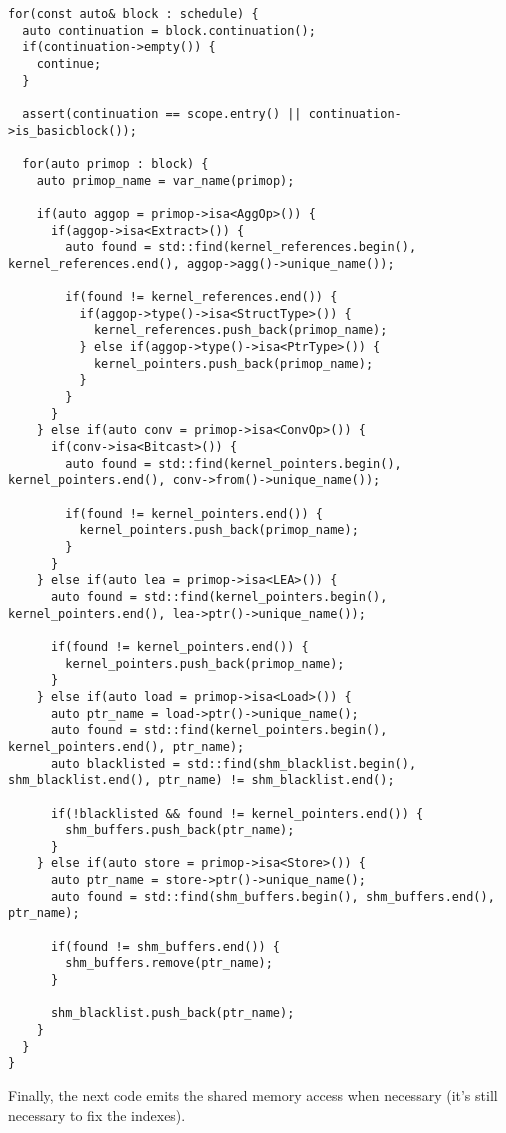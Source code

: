 \documentclass{article}
\begin{document}
\begin{verbatim}
for(const auto& block : schedule) {
  auto continuation = block.continuation();
  if(continuation->empty()) {
    continue;
  }

  assert(continuation == scope.entry() || continuation->is_basicblock());

  for(auto primop : block) {
    auto primop_name = var_name(primop);

    if(auto aggop = primop->isa<AggOp>()) {
      if(aggop->isa<Extract>()) {
        auto found = std::find(kernel_references.begin(), kernel_references.end(), aggop->agg()->unique_name());

        if(found != kernel_references.end()) {
          if(aggop->type()->isa<StructType>()) {
            kernel_references.push_back(primop_name);
          } else if(aggop->type()->isa<PtrType>()) {
            kernel_pointers.push_back(primop_name);
          }
        }
      }
    } else if(auto conv = primop->isa<ConvOp>()) {
      if(conv->isa<Bitcast>()) {
        auto found = std::find(kernel_pointers.begin(), kernel_pointers.end(), conv->from()->unique_name());

        if(found != kernel_pointers.end()) {
          kernel_pointers.push_back(primop_name);
        }
      }
    } else if(auto lea = primop->isa<LEA>()) {
      auto found = std::find(kernel_pointers.begin(), kernel_pointers.end(), lea->ptr()->unique_name());

      if(found != kernel_pointers.end()) {
        kernel_pointers.push_back(primop_name);
      }
    } else if(auto load = primop->isa<Load>()) {
      auto ptr_name = load->ptr()->unique_name();
      auto found = std::find(kernel_pointers.begin(), kernel_pointers.end(), ptr_name);
      auto blacklisted = std::find(shm_blacklist.begin(), shm_blacklist.end(), ptr_name) != shm_blacklist.end();

      if(!blacklisted && found != kernel_pointers.end()) {
        shm_buffers.push_back(ptr_name);
      }
    } else if(auto store = primop->isa<Store>()) {
      auto ptr_name = store->ptr()->unique_name();
      auto found = std::find(shm_buffers.begin(), shm_buffers.end(), ptr_name);

      if(found != shm_buffers.end()) {
        shm_buffers.remove(ptr_name);
      }

      shm_blacklist.push_back(ptr_name);
    }
  }
}
\end{verbatim}

Finally, the next code emits the shared memory access when necessary (it's still necessary to fix the indexes).
\end{document}
